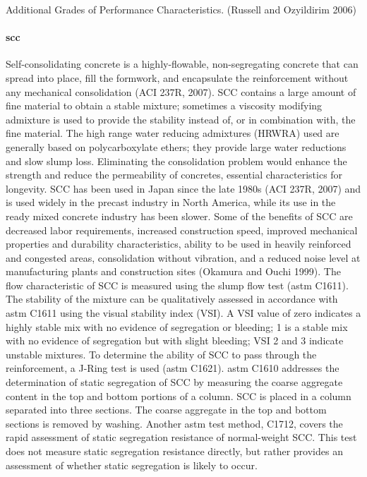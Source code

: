 \begin{table}
  \caption{Additional Grades of Performance Characteristics. (Russell and Ozyildirim 2006)}\label{tab:additional-grade}
\end{table}

\paragraph{\acrfull*{scc}}
Self-consolidating concrete is a highly-flowable, non-segregating concrete that can spread into place, fill the formwork, and encapsulate the reinforcement without any mechanical consolidation (ACI 237R, 2007). SCC
contains a large amount of fine material to obtain a stable mixture; sometimes a viscosity modifying admixture is used to provide the stability instead of, or in combination with, the fine material. The high range water reducing admixtures (HRWRA) used are generally based on polycarboxylate ethers; they provide large water reductions and slow slump loss. Eliminating the consolidation problem would enhance the strength and reduce the permeability of concretes, essential characteristics for longevity. SCC has been used in Japan since the late 1980s (ACI 237R, 2007) and is used widely in the precast industry in North America, while its use in the ready mixed concrete industry has been slower. Some of the benefits of SCC are decreased labor requirements, increased construction speed, improved mechanical properties and durability characteristics, ability to be used in heavily reinforced and congested areas, consolidation without vibration, and a reduced noise level at manufacturing plants and construction sites (Okamura and Ouchi 1999). The flow characteristic of SCC is measured using the slump flow test (\acrshort*{astm} C1611). The stability of the mixture can be qualitatively assessed in accordance with \acrshort*{astm} C1611 using the visual stability index (VSI). A VSI value of zero indicates a highly stable mix with no evidence of segregation or bleeding; 1 is a stable mix with no evidence of segregation but with slight bleeding; VSI 2 and 3 indicate unstable mixtures. To determine the ability of SCC to pass through the reinforcement, a J-Ring test is used (\acrshort*{astm} C1621). \acrshort*{astm} C1610 addresses the determination of static segregation of SCC by measuring the coarse aggregate content in the top and bottom portions of a column. SCC is placed in a column separated into three sections. The coarse aggregate in the top and bottom sections is removed by washing. Another \acrshort*{astm} test method, C1712, covers the rapid assessment of static segregation resistance of normal-weight SCC. This test does not measure static segregation resistance directly, but rather provides an assessment of whether static segregation is likely to occur.

